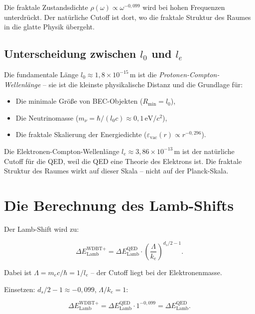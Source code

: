 Die fraktale Zustandsdichte \( \rho(\omega) \propto \omega^{-0,099} \) wird bei hohen Frequenzen unterdrückt. Der natürliche Cutoff ist dort, wo die fraktale
Struktur des Raumes in die glatte Physik übergeht.

\subsection{Unterscheidung zwischen \( l_0 \) und \( l_e \)}

Die fundamentale Länge \( l_0 \approx 1,8 \times 10^{-15} \, \text{m} \) ist die \emph{Protonen-Compton-Wellenlänge} – sie ist die kleinste physikalische Distanz und
die Grundlage für:

\begin{itemize}
    \item Die minimale Größe von BEC-Objekten (\( R_{\min} = l_0 \)),
    \item Die Neutrinomasse (\( m_\nu = \hbar/(l_0 c) \approx 0,1 \, \text{eV}/c^2 \)),
    \item Die fraktale Skalierung der Energiedichte (\( \varepsilon_{\text{vac}}(r) \propto r^{-0,296} \)).
\end{itemize}

Die Elektronen-Compton-Wellenlänge \( l_e \approx 3,86 \times 10^{-13} \, \text{m} \) ist der natürliche Cutoff für die QED, weil die QED eine Theorie des Elektrons
ist. Die fraktale Struktur des Raumes wirkt auf dieser Skala – nicht auf der Planck-Skala.

\section{Die Berechnung des Lamb-Shifts}

Der Lamb-Shift wird zu:

\begin{equation}
\Delta E_{\text{Lamb}}^{\text{WDBT+}} = \Delta E_{\text{Lamb}}^{\text{QED}} \cdot \left( \frac{\Lambda}{k_e} \right)^{d_s/2 - 1}. \tag{7.4}
\end{equation}

Dabei ist \( \Lambda = m_e c / \hbar = 1/l_e \) – der Cutoff liegt bei der Elektronenmasse.

Einsetzen: \( d_s/2 - 1 \approx -0,099 \), \( \Lambda/k_e = 1 \):

\begin{equation}
\Delta E_{\text{Lamb}}^{\text{WDBT+}} = \Delta E_{\text{Lamb}}^{\text{QED}} \cdot 1^{ -0,099 } = \Delta E_{\text{Lamb}}^{\text{QED}}. \tag{7.5}
\end{equation}

